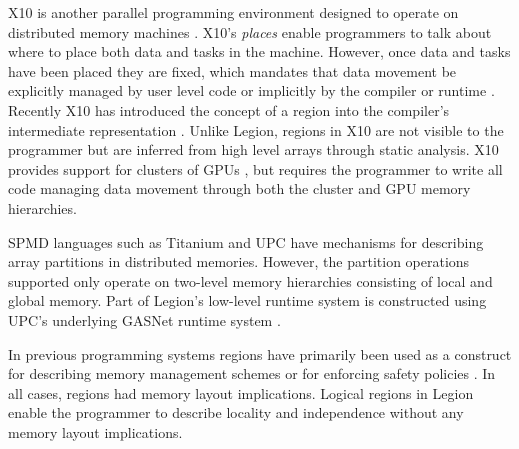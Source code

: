 X10 is another parallel programming environment designed to operate on distributed
memory machines \cite{X1005}.  X10's {\em places} enable programmers to talk about where
to place both data and tasks in the machine.  However, once data and tasks have
been placed they are fixed, which mandates that data movement be explicitly managed by
user level code or implicitly by the compiler or runtime \cite{X1008}.  Recently X10 has introduced
the concept of a region into the compiler's intermediate representation \cite{X1011}.
Unlike Legion, regions in X10 are not visible to the programmer but are inferred
from high level arrays through static analysis.  X10 provides support for clusters of GPUs
\cite{X10GPU}, but requires the programmer to write all code managing data movement
through both the cluster and GPU memory hierarchies.

SPMD languages such as Titanium \cite{TIT98} and UPC \cite{UPC99} have
mechanisms for describing array partitions in distributed memories.
However, the partition operations supported only operate on two-level
memory hierarchies consisting of local and global memory. 
Part of Legion's
low-level runtime system is constructed using UPC's underlying GASNet
runtime system \cite{GASNET07}.

In previous programming systems regions have primarily been used as a construct for
describing memory management schemes \cite{REAPS02}\cite{RC01}  
or for enforcing safety policies \cite{CYCLONE01}.  In all cases, regions had
memory layout implications.  Logical regions in Legion enable the programmer to
describe locality and independence without any memory layout implications.

